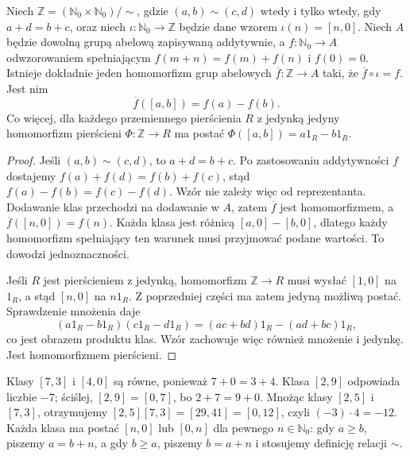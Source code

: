 \begin{twierdzenie}
\label{aa:tw:z-grothendieck-universal}
Niech $\mathbb Z=(\mathbb N_0\times\mathbb N_0)/\sim$, gdzie
$(a,b)\sim(c,d)$ wtedy i tylko wtedy, gdy $a+d=b+c$,
oraz niech $\iota:\mathbb N_0\to\mathbb Z$ będzie dane wzorem
$\iota(n)=[n,0]$. Niech $A$ będzie dowolną grupą abelową
zapisywaną addytywnie,
a $f:\mathbb N_0\to A$ odwzorowaniem spełniającym
$f(m+n)=f(m)+f(n)$ i $f(0)=0$. Istnieje dokładnie jeden
homomorfizm grup abelowych $\overline f:\mathbb Z\to A$
taki, że $\overline f\circ\iota=f$. Jest nim
\[
 \overline f([a,b])=f(a)-f(b).
\]
Co więcej, dla każdego przemiennego pierścienia $R$
z jedynką jedyny homomorfizm pierścieni
$\Phi:\mathbb Z\to R$ ma postać
$\Phi([a,b])=a1_R-b1_R$.
\end{twierdzenie}
\begin{proof}
Jeśli $(a,b)\sim(c,d)$, to $a+d=b+c$.
Po zastosowaniu addytywności $f$ dostajemy
$f(a)+f(d)=f(b)+f(c)$, stąd
$f(a)-f(b)=f(c)-f(d)$. Wzór nie zależy więc
od reprezentanta. Dodawanie klas przechodzi na dodawanie
w $A$, zatem $\overline f$ jest homomorfizmem,
a $\overline f([n,0])=f(n)$. Każda klasa jest różnicą
$[a,0]-[b,0]$, dlatego każdy homomorfizm spełniający
ten warunek musi przyjmować podane wartości. To dowodzi
jednoznaczności.

Jeśli $R$ jest pierścieniem z jedynką, homomorfizm
$\mathbb Z\to R$ musi wysłać $[1,0]$ na $1_R$, a stąd
$[n,0]$ na $n1_R$. Z poprzedniej części ma zatem
jedyną możliwą postać. Sprawdzenie mnożenia daje
\[
 (a1_R-b1_R)(c1_R-d1_R)
 =(ac+bd)1_R-(ad+bc)1_R,
\]
co jest obrazem produktu klas. Wzór zachowuje więc
również mnożenie i jedynkę. Jest homomorfizmem pierścieni.
\end{proof}

\begin{przyklad}
\label{aa:prz:z-pairs}
Klasy $[7,3]$ i $[4,0]$ są równe, ponieważ
$7+0=3+4$. Klasa $[2,9]$ odpowiada liczbie $-7$;
ściślej, $[2,9]=[0,7]$, bo $2+7=9+0$.
Mnożąc klasy $[2,5]$ i $[7,3]$, otrzymujemy
$[2,5][7,3]=[29,41]=[0,12]$, czyli $(-3)\cdot4=-12$.
Każda klasa ma postać $[n,0]$ lub $[0,n]$ dla pewnego
$n\in\mathbb N_0$: gdy $a\ge b$, piszemy $a=b+n$,
a gdy $b\ge a$, piszemy $b=a+n$ i stosujemy definicję
relacji $\sim$.
\end{przyklad}

